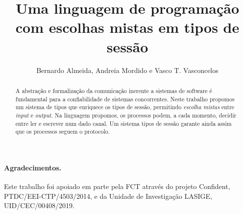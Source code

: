 \documentclass[runningheads]{llncs}
\title{Uma linguagem de programação com escolhas mistas em tipos de sessão}
\author{Bernardo Almeida, Andreia Mordido e Vasco T. Vasconcelos}
\institute{LASIGE, Faculdade de Ciências, Universidade de Lisboa, Portugal}
\begin{document}
\maketitle

\begin{abstract}
  A abstração e formalização da comunicação inerente a sistemas de
  software é fundamental para a confiabilidade de sistemas
  concorrentes.  Neste trabalho propomos um sistema de tipos que
  enriquece os tipos de sessão, permitindo \emph{escolha mistas} entre
  \textit{input} e \textit{output}.
  Na linguagem propomos, os processos podem, a cada momento, decidir
  entre ler e escrever num dado canal.
  Um sistema tipos de sessão garante ainda assim que os processos
  seguem o protocolo.


\end{abstract}


% 


\paragraph{Agradecimentos.}

Este trabalho foi apoiado em parte pela FCT através do projeto
Confident, PTDC/EEI-CTP/4503/2014, e da Unidade de Investigação LASIGE,
UID/CEC/00408/2019.



\end{document}
